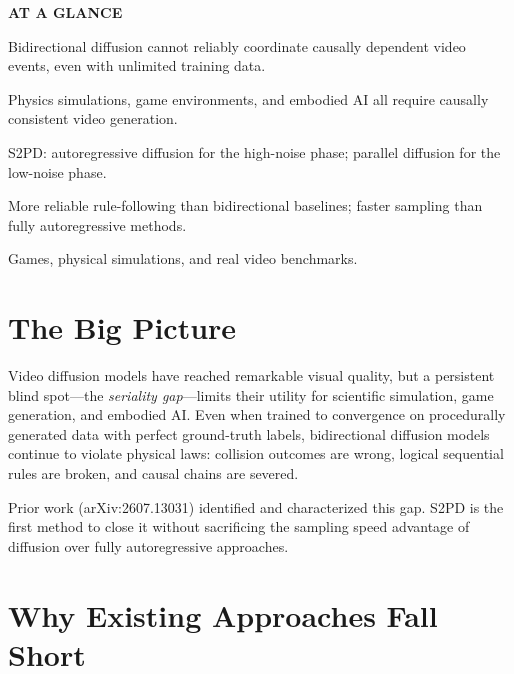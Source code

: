 \documentclass[10pt,twocolumn]{article}
\begin{document}
\begin{mdframed}[backgroundcolor=boxgray,linecolor=rulered,linewidth=1pt,
    innerleftmargin=6pt,innerrightmargin=6pt,
    innertopmargin=6pt,innerbottommargin=6pt]
\textbf{\small AT A GLANCE}\par\vspace{4pt}
\begin{description}[leftmargin=0pt,labelsep=4pt,itemsep=2pt,parsep=0pt,
    font=\small\bfseries]
  \item[Problem:] Bidirectional diffusion cannot reliably coordinate causally
    dependent video events, even with unlimited training data.
  \item[Why it matters:] Physics simulations, game environments, and embodied
    AI all require causally consistent video generation.
  \item[Method:] S2PD: autoregressive diffusion for the high-noise phase;
    parallel diffusion for the low-noise phase.
  \item[Result:] More reliable rule-following than bidirectional baselines;
    faster sampling than fully autoregressive methods.
  \item[Evidence:] Games, physical simulations, and real video benchmarks.
\end{description}
\end{mdframed}

\section{The Big Picture}

Video diffusion models have reached remarkable visual quality, but a persistent
blind spot---the \emph{seriality gap}---limits their utility for scientific
simulation, game generation, and embodied AI. Even when trained to convergence
on procedurally generated data with perfect ground-truth labels, bidirectional
diffusion models continue to violate physical laws: collision outcomes are wrong,
logical sequential rules are broken, and causal chains are severed.

Prior work (arXiv:2607.13031) identified and characterized this gap. S2PD is
the first method to close it without sacrificing the sampling speed advantage
of diffusion over fully autoregressive approaches.

\section{Why Existing Approaches Fall Short}
\end{document}
